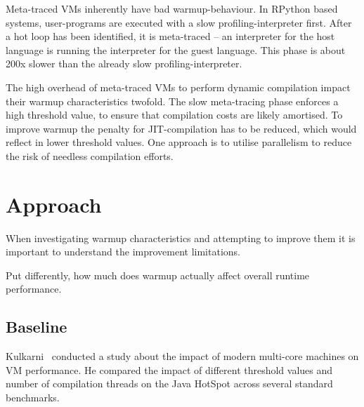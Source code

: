 Meta-traced VMs inherently  have bad warmup-behaviour. In RPython based systems,
user-programs are executed with a slow profiling-interpreter first. After a hot
loop has been identified, it is meta-traced -- an interpreter for the host
language is running the interpreter for the guest language. This phase is about
200x slower than the already slow profiling-interpreter.

The high overhead of meta-traced VMs to perform dynamic compilation impact their
warmup characteristics twofold. The slow meta-tracing phase enforces a high
threshold value, to ensure that compilation costs are likely amortised. To
improve warmup the penalty for JIT-compilation has to be reduced, which would
reflect in lower threshold values. One approach is to utilise parallelism to
reduce the risk of needless compilation efforts.





\section{Approach}

When investigating warmup characteristics and attempting to improve them it is
important to understand the improvement limitations.



 Put differently, how much does warmup actually
affect overall runtime performance.


\subsection{Baseline}


Kulkarni~\cite{kulkarni2011jit} conducted a study about the impact of modern
multi-core machines on VM performance. He compared the impact of different
threshold values and number of compilation threads on the Java HotSpot across
several standard benchmarks. 


